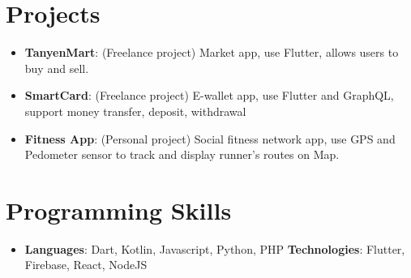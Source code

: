 \documentclass[letterpaper,11pt]{article}
\newcommand{\resumeItem}[2]{
  \item\small{
    \textbf{#1}{: #2 \vspace{-2pt}}
  }
}
\newcommand{\resumeSubItem}[2]{\resumeItem{#1}{#2}\vspace{-4pt}}
\newcommand{\resumeSubHeadingListStart}{\begin{itemize}[leftmargin=*]}
\newcommand{\resumeSubHeadingListEnd}{\end{itemize}}
\begin{document}
\section{Projects}
  \resumeSubHeadingListStart
    \resumeSubItem{TanyenMart}
      {(Freelance project) Market app, use Flutter, allows users to buy and sell.}
    \resumeSubItem{SmartCard}
      {(Freelance project) E-wallet app, use Flutter and GraphQL, support money transfer, deposit, withdrawal}
    \resumeSubItem{Fitness App}
      {(Personal project) Social fitness network app, use GPS and Pedometer sensor to track and display runner’s routes on Map.}
  \resumeSubHeadingListEnd

%
\section{Programming Skills}
 \resumeSubHeadingListStart
   \item{
     \textbf{Languages}{: Dart, Kotlin, Javascript, Python, PHP}
     \hfill
     \textbf{Technologies}{: Flutter, Firebase, React, NodeJS}
   }
 \resumeSubHeadingListEnd


\end{document}
